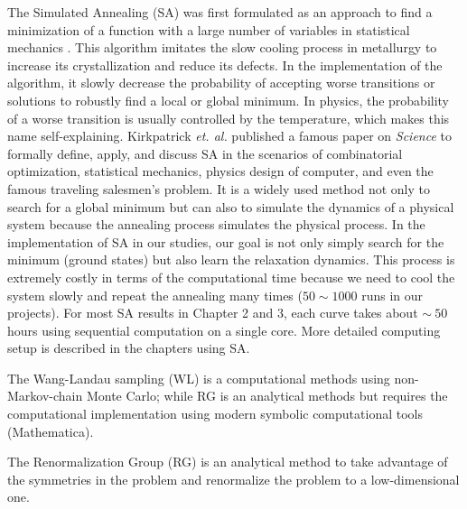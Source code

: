The Simulated Annealing (SA) \cite{SA} was first formulated as an approach to find a minimization of a function with a large number of variables in statistical mechanics \cite{khachaturyan1979statistical, khachaturyan1981thermodynamic}. This algorithm imitates the slow cooling process in metallurgy to increase its crystallization and reduce its defects. In the implementation of the algorithm, it slowly decrease the probability of accepting worse transitions or solutions to robustly find a local or global minimum. In physics, the probability of a worse transition is usually controlled by the temperature, which makes this name self-explaining. Kirkpatrick {\it et. al.} \cite{SA} published a famous paper on {\it Science} to formally define, apply, and discuss SA  in the scenarios of combinatorial optimization, statistical mechanics, physics design of computer, and even the famous traveling salesmen's problem. It is a widely used method not only to search for a global minimum but can also to simulate the dynamics of a physical system because the annealing process simulates the physical process.
In the implementation of SA in our studies, our goal is not only simply search for the minimum (ground states) but also learn the relaxation dynamics. This process is extremely costly in terms of the computational time because we need to cool the system slowly and repeat the annealing many times ($50\sim 1000$ runs in our projects). For most SA results in Chapter 2 and 3, each curve takes about $\sim ~50$ hours using sequential computation on a single core. More detailed computing setup is described in the chapters using SA.


The Wang-Landau sampling (WL) \cite{Wang2001} is a computational methods using non-Markov-chain Monte Carlo; while RG is an analytical methods but requires the computational implementation using modern symbolic computational tools (Mathematica).


The Renormalization Group (RG) is an analytical method to take advantage of the symmetries in the problem and renormalize the problem to a low-dimensional one. 











